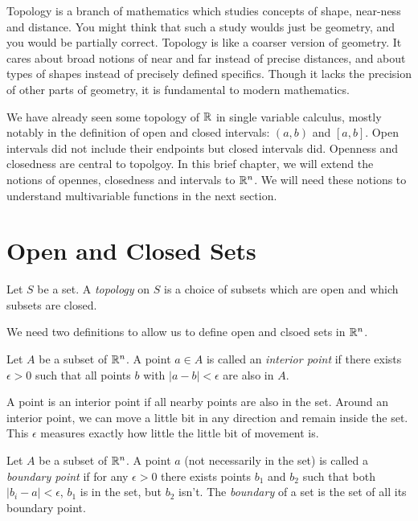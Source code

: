 \documentclass[fleqn,letterpaper]{report}
\begin{document}
Topology is a branch of mathematics which studies concepts of
shape, near-ness and distance. You might think that such a
study woulds just be geometry, and you would be partially
correct. Topology is like a coarser version of geometry. It
cares about broad notions of near and far instead of precise
distances, and about types of shapes instead of precisely
defined specifics. Though it lacks the precision of other
parts of geometry, it is fundamental to modern mathematics.

We have already seen some topology of $\mathbb{R}$ in single variable
calculus, mostly notably in the definition of open and closed
intervals: $(a,b)$ and $[a,b]$. Open intervals did not
include their endpoints but closed intervals did. Openness and
closedness are central to topolgoy. In this brief chapter, we
will extend the notions of opennes, closedness and intervals
to $\mathbb{R}^n$. We will need these notions to understand
multivariable functions in the next section.

\section{Open and Closed Sets}
\label{open-closed}

\begin{defn}
Let $S$ be a set. A \emph{topology} on $S$ is a choice of
subsets which are open and which subsets are closed.
\end{defn}

We need two definitions to allow us to define open and
clsoed sets in $\mathbb{R}^n$.

\begin{defn}
Let $A$ be a subset of $\mathbb{R}^n$. A point $a \in A$ is called
an \emph{interior point} if there exists $\epsilon > 0$ such
that all points $b$ with $|a-b|< \epsilon$ are also in $A$.
\end{defn}

A point is an interior point if all nearby points are also in
the set. Around an interior point, we can move a little bit in
any direction and remain inside the set. This $\epsilon$
measures exactly how little the little bit of movement is.

\begin{defn}
Let $A$ be a subset of $\mathbb{R}^n$. A point $a$ (not necessarily
in the set) is called a
\emph{boundary point} if for any $\epsilon > 0$ there exists
points $b_1$ and $b_2$ such that both $|b_i -
a|<\epsilon$, $b_1$ is in the set, but $b_2$ isn't. The
\emph{boundary} of a set is the set of all its boundary point.
\end{defn}
\end{document}
